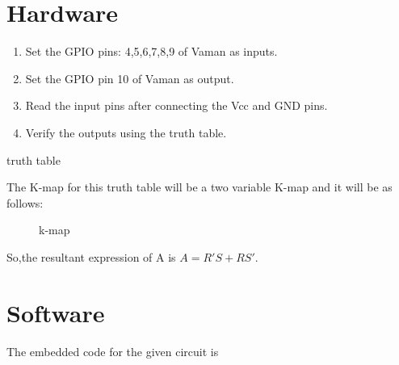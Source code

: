 \documentclass[12pt]{article}
\begin{document}
\section{Hardware}
	\begin{enumerate}
\item Set the GPIO pins: 4,5,6,7,8,9 of Vaman as inputs.
\item Set the GPIO pin 10 of Vaman as output.
\item Read the input pins after connecting the Vcc and GND pins.
\item Verify the outputs using the truth table.
\end{enumerate}
\begin{table}[h]
\begin{center}
	
\end{center}
\caption{truth table}
\label{table 2}
\end{table}
The K-map for this truth table will be a two variable K-map and it will be as follows:
\begin{figure}[h]
	
\caption{k-map}
\label{fig2}
\end{figure}

So,the resultant expression of A is $A = R'S + RS'$.
\pagebreak
\section{Software}

The embedded code for the given circuit is \\

\end{document}
